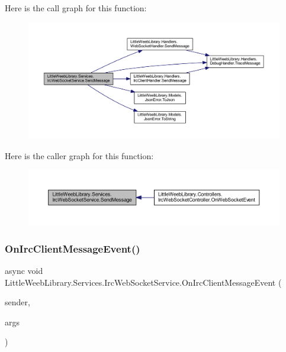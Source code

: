 Here is the call graph for this function\+:\nopagebreak
\begin{figure}[H]
\begin{center}
\leavevmode
\includegraphics[width=350pt]{class_little_weeb_library_1_1_services_1_1_irc_web_socket_service_aa9fcd18dc123e1356049b4b95bbaf2ff_cgraph}
\end{center}
\end{figure}
Here is the caller graph for this function\+:\nopagebreak
\begin{figure}[H]
\begin{center}
\leavevmode
\includegraphics[width=350pt]{class_little_weeb_library_1_1_services_1_1_irc_web_socket_service_aa9fcd18dc123e1356049b4b95bbaf2ff_icgraph}
\end{center}
\end{figure}
\mbox{\label{class_little_weeb_library_1_1_services_1_1_irc_web_socket_service_ab8023cd1161bcff9bebf2614764614fe}} 
\subsubsection{\texorpdfstring{On\+Irc\+Client\+Message\+Event()}{OnIrcClientMessageEvent()}}
{\footnotesize\ttfamily async void Little\+Weeb\+Library.\+Services.\+Irc\+Web\+Socket\+Service.\+On\+Irc\+Client\+Message\+Event (\begin{DoxyParamCaption}\item[{object}]{sender,  }\item[{\mbox{\hyperlink{class_little_weeb_library_1_1_event_arguments_1_1_irc_client_message_event_args}{Irc\+Client\+Message\+Event\+Args}}}]{args }\end{DoxyParamCaption})\hspace{0.3cm}{\ttfamily [private]}}



